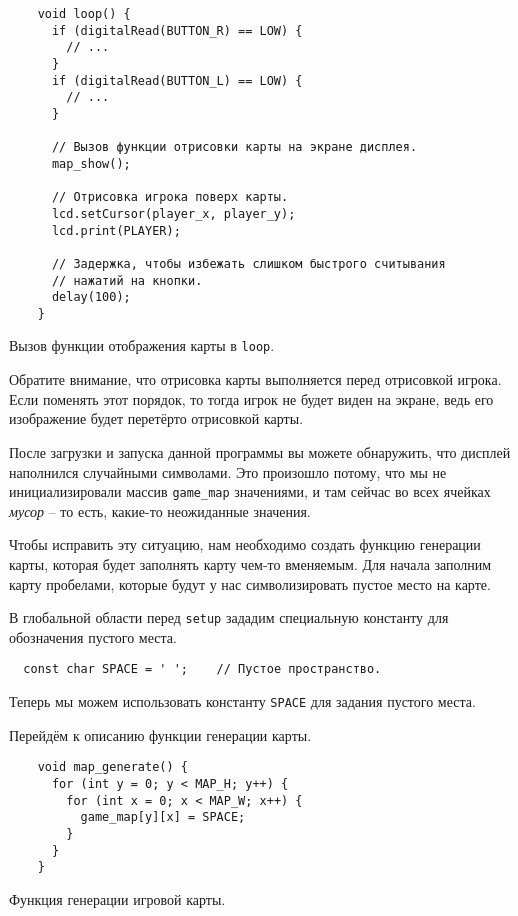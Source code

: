 \documentclass[../sparc.tex]{subfiles}
\begin{document}
\begin{listing}[H]
  \begin{verbatim}
    void loop() {
      if (digitalRead(BUTTON_R) == LOW) {
        // ...
      }
      if (digitalRead(BUTTON_L) == LOW) {
        // ...
      }

      // Вызов функции отрисовки карты на экране дисплея.
      map_show();

      // Отрисовка игрока поверх карты.
      lcd.setCursor(player_x, player_y);
      lcd.print(PLAYER);

      // Задержка, чтобы избежать слишком быстрого считывания
      // нажатий на кнопки.
      delay(100);
    }
  \end{verbatim}
  \caption{Вызов функции отображения карты в \texttt{loop}.}
  \label{listing:game-dev-map-show-call}
\end{listing}

Обратите внимание, что отрисовка карты выполняется перед отрисовкой игрока.
Если поменять этот порядок, то тогда игрок не будет виден на экране, ведь его
изображение будет перетёрто отрисовкой карты.

После загрузки и запуска данной программы вы можете обнаружить, что дисплей
наполнился случайными символами.  Это произошло потому, что мы не
инициализировали массив \texttt{game\_map} значениями, и там сейчас во всех
ячейках \emph{мусор} -- то есть, какие-то неожиданные значения.

Чтобы исправить эту ситуацию, нам необходимо создать функцию генерации карты,
которая будет заполнять карту чем-то вменяемым.  Для начала заполним карту
пробелами, которые будут у нас символизировать пустое место на карте.

В глобальной области перед \texttt{setup} зададим специальную константу для
обозначения пустого места.

\begin{verbatim}
  const char SPACE = ' ';    // Пустое пространство.
\end{verbatim}

Теперь мы можем использовать константу \texttt{SPACE} для задания пустого места.

Перейдём к описанию функции генерации карты.

\begin{listing}[H]
  \begin{verbatim}
    void map_generate() {
      for (int y = 0; y < MAP_H; y++) {
        for (int x = 0; x < MAP_W; x++) {
          game_map[y][x] = SPACE;
        }
      }
    }
  \end{verbatim}
  \caption{Функция генерации игровой карты.}
  \label{listing:game-dev-map-generate}
\end{listing}
\end{document}
